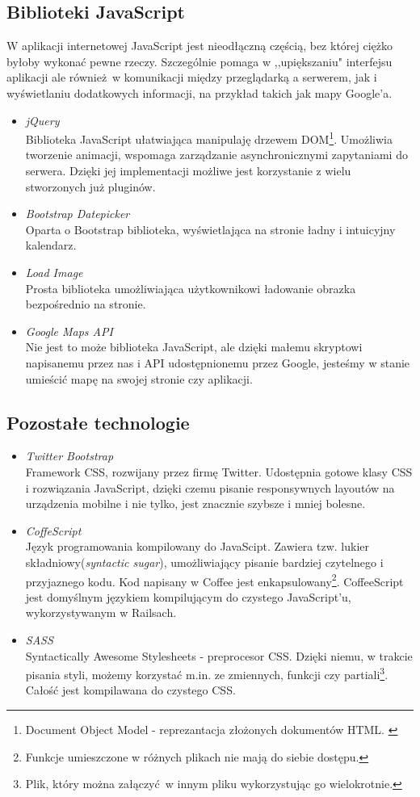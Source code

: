   \subsection{Biblioteki JavaScript}
    W aplikacji internetowej JavaScript jest nieodłączną częścią, bez której ciężko byłoby wykonać pewne rzeczy. Szczególnie pomaga w ,,upiększaniu" interfejsu aplikacji ale również w komunikacji między przeglądarką a serwerem, jak i wyświetlaniu dodatkowych informacji, na przykład takich jak mapy Google'a.

    \begin{itemize}
      \item \emph{jQuery} \\ Biblioteka JavaScript ułatwiająca manipulaję drzewem DOM\footnote{Document Object Model - reprezantacja złożonych dokumentów HTML. \cite{html5_css3}}. Umożliwia tworzenie animacji, wspomaga zarządzanie asynchronicznymi zapytaniami do serwera. Dzięki jej implementacji możliwe jest korzystanie z wielu stworzonych już pluginów.
      \item \emph{Bootstrap Datepicker} \\ Oparta o Bootstrap biblioteka, wyświetlająca na stronie ładny i intuicyjny kalendarz.
      \item \emph{Load Image} \\ Prosta biblioteka umożliwiająca użytkownikowi ładowanie obrazka bezpośrednio na stronie.
      \item \emph{Google Maps API} \\ Nie jest to może biblioteka JavaScript, ale dzięki małemu skryptowi napisanemu przez nas i API udostępnionemu przez Google, jesteśmy w stanie umieścić mapę na swojej stronie czy aplikacji.
    \end{itemize}
  \subsection{Pozostałe technologie}
    \begin{itemize}
      \item \emph{Twitter Bootstrap} \\ Framework CSS, rozwijany przez firmę Twitter. Udostępnia gotowe klasy CSS i rozwiązania JavaScript, dzięki czemu pisanie responsywnych layoutów na urządzenia mobilne i nie tylko, jest znacznie szybsze i mniej bolesne.
      \item \emph{CoffeScript} \\ Język programowania kompilowany do JavaScipt. Zawiera tzw. lukier składniowy(\emph{syntactic sugar}), umożliwiający pisanie bardziej czytelnego i przyjaznego kodu. Kod napisany w Coffee jest enkapsulowany\footnote{Funkcje umieszczone w różnych plikach nie mają do siebie dostępu.}. CoffeeScript jest domyślnym językiem kompilującym do czystego JavaScript'u, wykorzystywanym w Railsach.
      \item \emph{SASS} \\ Syntactically Awesome Stylesheets - preprocesor CSS. Dzięki niemu, w trakcie pisania styli, możemy korzystać m.in. ze zmiennych, funkcji czy partiali\footnote{Plik, który można załączyć w innym pliku wykorzystując go wielokrotnie.}. Całość jest kompilawana do czystego CSS.
    \end{itemize}
